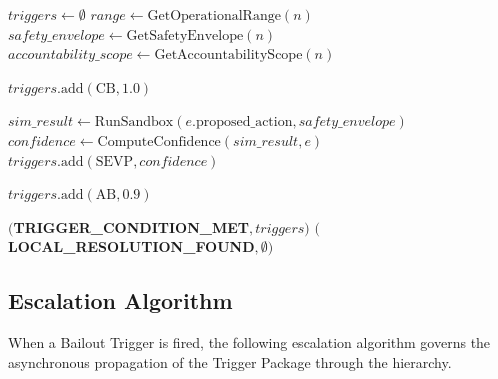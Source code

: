 \begin{algorithm}
\caption{Bailout Trigger Condition Evaluation}
\begin{algorithmic}[1]
  \State $triggers \gets \emptyset$
  \State $range \gets \text{GetOperationalRange}(n)$
  \State $safety\_envelope \gets \text{GetSafetyEnvelope}(n)$
  \State $accountability\_scope \gets \text{GetAccountabilityScope}(n)$

    \State $triggers.\text{add}(\text{CB}, 1.0)$ 
  \EndIf

  \State $sim\_result \gets \text{RunSandbox}(e.\text{proposed\_action}, safety\_envelope)$
    \State $confidence \gets \text{ComputeConfidence}(sim\_result, e)$
    \State $triggers.\text{add}(\text{SEVP}, confidence)$
  \EndIf

    \State $triggers.\text{add}(\text{AB}, 0.9)$ 
  \EndIf

    \State \Return $($\textbf{TRIGGER\_CONDITION\_MET}$, triggers)$
  \Else
    \State \Return $($\textbf{LOCAL\_RESOLUTION\_FOUND}$, \emptyset)$
  \EndIf
\EndProcedure
\end{algorithmic}
\end{algorithm}

\subsection{Escalation Algorithm}

When a Bailout Trigger is fired, the following escalation algorithm governs the asynchronous propagation of the Trigger Package through the hierarchy.

